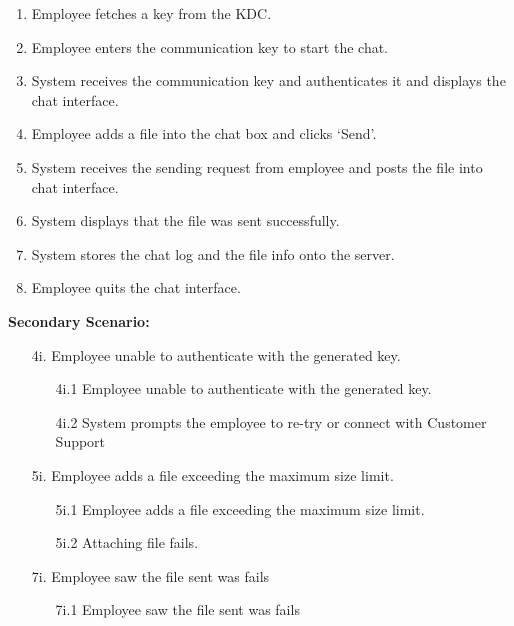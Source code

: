 \documentclass[]{article}
\begin{document}
\begin{enumerate}[{\bf BE1.}]
\begin{enumerate}[{\bf BE7.}]
\begin{enumerate}[{  }]
\begin{enumerate}[{  1.}]
                    \item Employee fetches a key from the KDC.
                    \item Employee enters the communication key to start the chat. 
                    \item System receives the communication key and authenticates it and displays the chat interface.
                    \item Employee adds a file into the chat box and clicks ‘Send’.
                    \item System receives the sending request from employee and posts the file into chat interface. 
                    \item System displays that the file was sent successfully.
                    \item System stores the chat log and the file info onto the server.
                    \item Employee quits the chat interface.
            \end{enumerate}
        \end{enumerate}
	        \textbf{Secondary Scenario:}
                \begin{enumerate}
                    \item[4i.] Employee unable to authenticate with the generated key. 
                    \begin{enumerate}
                        \item[4i.1] Employee unable to authenticate with the generated key.
                        \item[4i.2] System prompts the employee to re-try or connect with Customer Support 
                    \end{enumerate}
                    \item[5i.] Employee adds a file exceeding the maximum size limit. 
                    \begin{enumerate}
                        \item[5i.1] Employee adds a file exceeding the maximum size limit. 
                        \item[5i.2] Attaching file fails.
                    \end{enumerate}
                    \item[7i.] Employee saw the file sent was fails
                    \begin{enumerate}
                        \item[7i.1] Employee saw the file sent was fails

\end{enumerate}
\end{enumerate}
\end{enumerate}
\end{enumerate}
\end{document}
